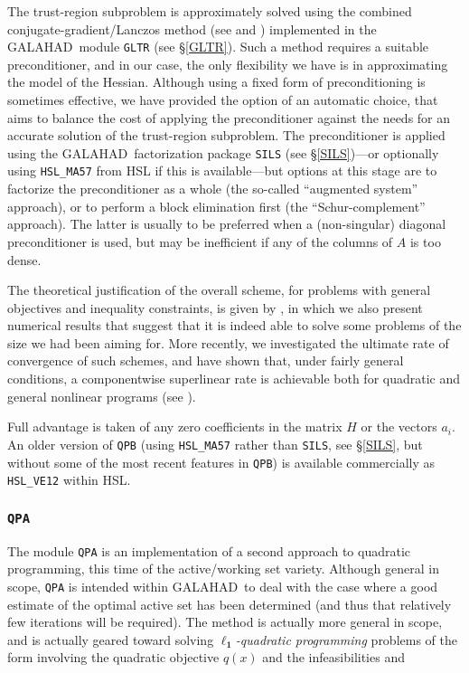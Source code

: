 \documentclass[twoside]{article}
\newcommand{\gal}{{\sf GALAHAD}}
\newcommand{\ltsubsubsection}[1]{\subsubsection{{\tt #1}} \label{#1}}
\begin{document}
The trust-region subproblem is approximately solved using the 
combined conjugate-gradient/Lan\-czos method (see  and
) implemented in the \gal\ module {\tt GLTR}
(see \S\ref{GLTR}).
Such a method requires a suitable preconditioner,
and in our case, the only flexibility we have is in approximating the
model of the Hessian. Although using a fixed form of preconditioning is
sometimes effective, we have provided the option of an automatic choice,
that aims to balance the cost of applying the preconditioner against
the needs for an accurate solution of the trust-region subproblem. 
The preconditioner is applied using the \gal\ factorization package
{\tt SILS} (see \S\ref{SILS})---or optionally using {\tt HSL\_MA57} 
from HSL if this is available---but options at this stage are
to factorize the preconditioner as a whole (the so-called ``augmented system''
approach), or to perform a block elimination first (the ``Schur-complement''
approach). The latter is usually to be preferred when a (non-singular) diagonal 
preconditioner is used, but may be inefficient if any of the columns
of $A$ is too dense.

The theoretical justification of the
overall scheme, for problems with general objectives and 
inequality constraints, 
is given by , in which we also present
numerical results that suggest that it is indeed able to solve 
some problems of the size we had been aiming for. 
More recently, we investigated the ultimate rate of convergence
of such schemes, and have shown that, under fairly general conditions, 
a componentwise superlinear rate is achievable both for quadratic and general 
nonlinear programs (see ).

Full advantage is taken of any zero coefficients in the matrix $H$ or the
vectors $a_{i}$.
An older version of {\tt QPB} (using {\tt HSL\_MA57} rather than {\tt SILS},
see \S\ref{SILS}, but without some of the most recent features in {\tt QPB})
is available commercially as {\tt HSL\_VE12} within HSL.

\ltsubsubsection{QPA}

The module {\tt QPA} is an implementation of a second approach
to quadratic programming, this time of the active/working set variety.
Although general in
scope, {\tt QPA} is intended within \gal\ to deal with the case 
where a good
estimate of the optimal active set has been determined (and thus that
relatively few iterations will be required). The method is actually more
general in scope, and is actually geared toward solving
{\em $\mathbf{\ell_1}$-quadratic programming} problems of the form
involving the quadratic objective $q(x)$ and the infeasibilities
and
\end{document}
